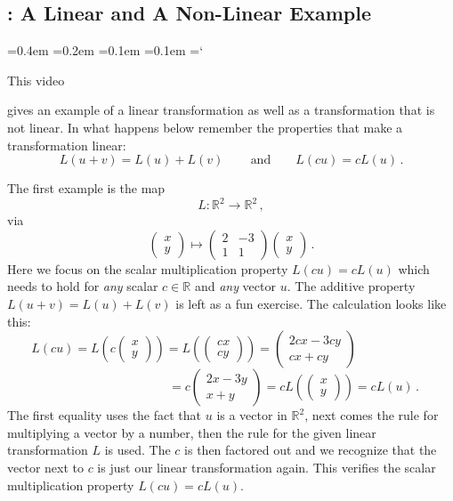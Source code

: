 
\subsection{\linTransTitle: A Linear and A Non-Linear Example}

{\ttfamily
{}\font=0.4em
\font=0.2em
\font=0.1em
\font=0.1em
\hyphenchar\font=`\-


\hypertarget{scripts_linear_transformations_example}{This video} gives
an example of  a linear transformation as well as a transformation that
is not linear. In what happens below remember the properties that 
make a transformation linear:
$$
L(u+v)=L(u)+L(v)\, \qquad\mbox{and} \qquad L(cu)=cL(u)\, .
$$


The first example is the map
$$
L:{\mathbb R}^2\longrightarrow {\mathbb R}^2\, ,
$$
via
$$
\begin{pmatrix}
x\\y
\end{pmatrix}
\mapsto 
\begin{pmatrix}
2&-3\\1&1
\end{pmatrix}
\begin{pmatrix}
x\\y
\end{pmatrix}\, .
$$
Here we focus on the scalar multiplication property $L(cu)=cL(u)$ which needs to hold for {\it any} scalar $c\in {\mathbb R}$
and {\it any} vector $u$. The additive property $L(u+v)=L(u)+L(v)$ is left as a fun exercise.
The calculation looks like this:
$$
L(cu)=L\left(c\begin{pmatrix}
x\\y
\end{pmatrix}\right)
=L\left(\begin{pmatrix}
cx\\cy
\end{pmatrix}\right)
=
\begin{pmatrix}
2cx-3cy\\cx+cy
\end{pmatrix}\qquad\qquad\qquad
$$
$$
\qquad\qquad\qquad\qquad\qquad
=
c\begin{pmatrix}
2x-3y\\x+y
\end{pmatrix}
=cL\left(\begin{pmatrix}
x\\y
\end{pmatrix}\right)=cL(u)\, .
$$
The first equality uses the fact that $u$ is a vector in ${\mathbb R}^2$, next comes the
rule for multiplying a vector by a number, then the rule for the given linear transformation $L$ is used.
The $c$ is then factored out and we recognize that the vector next to $c$ is just our linear transformation again.
This verifies the scalar multiplication property $L(cu)=cL(u)$.

}
